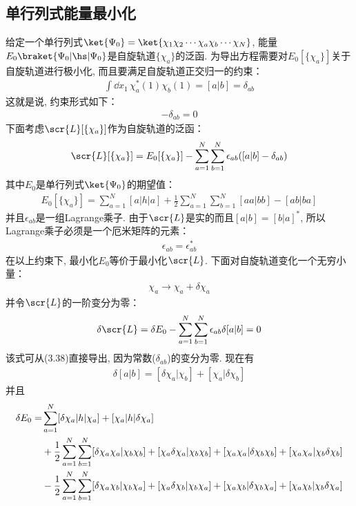 \subsection{单行列式能量最小化}
给定一个单行列式$\ket{\Psi_0} = \ket{\chi_1\chi_2\cdots\chi_a\chi_b\cdots\chi_N}$, 能量$E_0\braket{\Psi_0|\hs|\Psi_0}$是自旋轨道$\{\chi_a\}$的泛函. 为导出\hft 方程需要对$E_0[\{\chi_a \}]$关于自旋轨道进行极小化, 而且要满足自旋轨道正交归一的约束：
\begin{align}
\int\dd{x}_1\,\chi_a^*(1)\chi_b(1) = [a|b] = \delta_{ab}
\end{align}
这就是说, 约束形式如下：
\begin{align}
[a|b] - \delta_{ab} = 0
\end{align}
下面考虑$\scr{L}[\{\chi_a \}]$作为自旋轨道的泛函：
\begin{align}
\scr{L}[\{\chi_a \}] = E_0[\{\chi_a\}] - \sum_{a=1}^{N}\sum_{b=1}^{N}\epsilon_{ab}([a|b]-\delta_{ab})
\end{align}
其中$E_0$是单行列式$\ket{\Psi_0}$的期望值：
\begin{align}
E_0[\{\chi_a\}] = \sum_{a=1}^{N}[a|h|a] + \frac{1}{2}\sum_{a=1}^{N}\sum_{b=1}^{N}[aa|bb]- [ab|ba]
\end{align}
并且$\epsilon_{ab}$是一组Lagrange乘子. 由于$\scr{L}$是实的而且$[a|b]=[b|a]^*$, 所以Lagrange乘子必须是一个厄米矩阵的元素：
\begin{align}
\label{3.40}
\epsilon_{ab} = \epsilon_{ab}^*
\end{align}
在以上约束下, 最小化$E_0$等价于最小化$\scr{L}$. 下面对自旋轨道变化一个无穷小量：
\begin{align}
\chi_a \to \chi_a+\delta\chi_a
\end{align}
并令$\scr{L}$的一阶变分为零：
\begin{align}
\delta\scr{L} = \delta E_0 - \sum_{a=1}^{N}\sum_{b=1}^{N}\epsilon_{ab}\delta[a|b] = 0
\end{align}
该式可从(3.38)直接导出, 因为常数($\delta_{ab}$)的变分为零. 现在有
\begin{align}
\delta[a|b] = [\delta\chi_a|\chi_b] + [\chi_a|\delta\chi_b]
\end{align}
并且
\begin{align}
\delta E_0 = & \sum_{a=1}^{N}[\delta\chi_a|h|\chi_a] + [\chi_a|h|\delta\chi_a]\notag\\
           & + \frac{1}{2}\sum_{a=1}^{N}\sum_{b=1}^{N}[\delta\chi_a\chi_a|\chi_b\chi_b] + [\chi_a\delta\chi_a|\chi_b\chi_b] + [\chi_a\chi_a|\delta\chi_b\chi_b] + [\chi_a\chi_a|\chi_b\delta\chi_b]\notag\\
           & - \frac{1}{2}\sum_{a=1}^{N}\sum_{b=1}^{N}[\delta\chi_a\chi_b|\chi_b\chi_a] + [\chi_a\delta\chi_b|\chi_b\chi_a] + [\chi_a\chi_b|\delta\chi_b\chi_a] + [\chi_a\chi_b|\chi_b\delta\chi_a]
\end{align}

